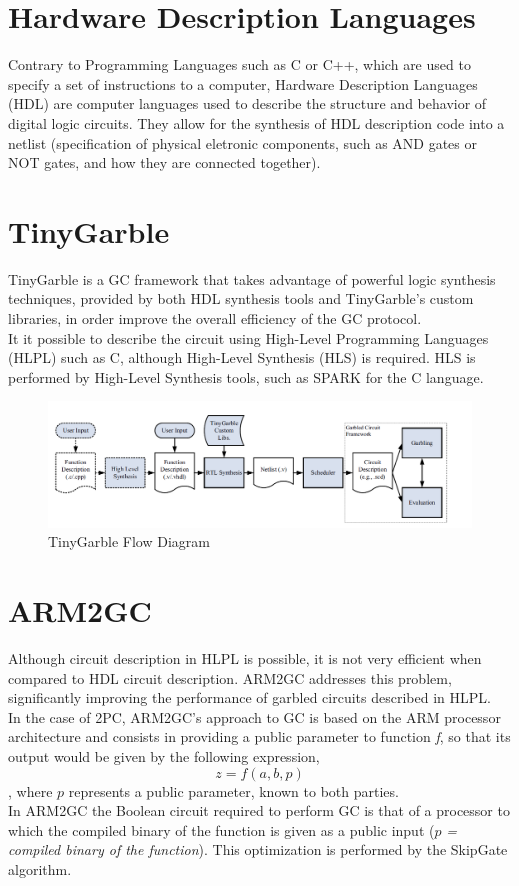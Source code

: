 \section{Hardware Description Languages}
Contrary to Programming Languages such as C or C++, which are used to specify a set of instructions to a computer, Hardware Description Languages (HDL) are computer languages used to describe the structure and behavior of digital logic circuits. They allow for the synthesis of HDL description code into a netlist (specification of physical eletronic components, such as AND gates or NOT gates, and how they are connected together).

\section{TinyGarble}
TinyGarble is a GC framework that takes advantage of powerful logic synthesis techniques, provided by both HDL synthesis tools
and TinyGarble's custom libraries, in order improve the overall efficiency of the GC protocol.\\
It it possible to describe the circuit using High-Level Programming Languages (HLPL) such as C, although High-Level Synthesis (HLS) is required. HLS is performed by High-Level Synthesis tools, such as SPARK for the C language.

\renewcommand{\figurename}{Figure}
\begin{figure}[H]
\centering
\includegraphics[width=.9\linewidth]{./figures/mpc/tinygarble_flow_diagram}
\caption{TinyGarble Flow Diagram}
\label{fig:tgdiagram}
\end{figure}

\section{ARM2GC}
Although circuit description in HLPL is possible, it is not very efficient when compared to HDL circuit description. ARM2GC addresses this problem, significantly improving the performance of garbled circuits described in HLPL.\\
In the case of 2PC, ARM2GC's approach to GC is based on the ARM processor architecture and consists in providing a public parameter to function \textit{f}, so that its output would be given by the following expression,
\begin{equation}\label{eq:arm2gc}
z = f(a,b,p)
\end{equation}
, where $p$ represents a public parameter, known to both parties.\\
In ARM2GC the Boolean circuit required to perform GC is that of a processor to which the compiled binary of the function is given as a public input ($p$\textit{ = compiled binary of the function}). This optimization is performed by the SkipGate algorithm.

 